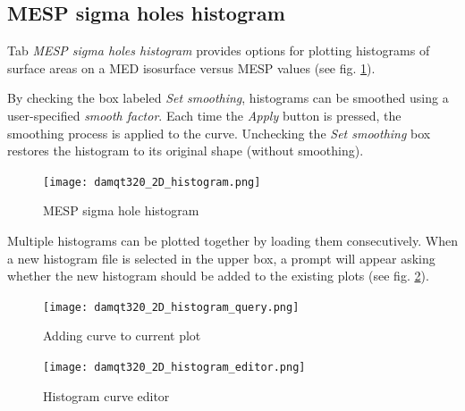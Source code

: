 \documentclass[10pt]{article}
\begin{document}
\subsection{MESP sigma holes histogram \label{sec:3.3}}

Tab {\it MESP sigma holes histogram} provides options  
for plotting histograms of surface areas on a MED isosurface versus MESP values  
(see fig. \ref{fig:3_3_1}).  

By checking the box labeled {\it Set smoothing},  
histograms can be smoothed using a user-specified {\it smooth factor}.  
Each time the {\it Apply} button is pressed, the smoothing process is applied to the curve.  
Unchecking the {\it Set smoothing} box restores the histogram to its original shape (without smoothing).  

\begin{figure}[H]
\begin{center}
\texttt{[image: damqt320\_2D\_histogram.png]}
\end{center}
\caption{{MESP sigma hole histogram}\label{fig:3_3_1}}
\end{figure}

Multiple histograms can be plotted together by loading them consecutively.  
When a new histogram file is selected in the upper box,  
a prompt will appear asking whether the new histogram should be added  
to the existing plots (see fig. \ref{fig:3_3_2}). 

\begin{minipage}{0.5\linewidth}

\begin{figure}[H]
\begin{center}
\texttt{[image: damqt320\_2D\_histogram\_query.png]}
\end{center}
\caption{{Adding curve to current plot}\label{fig:3_3_2}}
\end{figure}

\end{minipage}
\begin{minipage}{0.5\linewidth}

\begin{figure}[H]
\begin{center}
\texttt{[image: damqt320\_2D\_histogram\_editor.png]}
\end{center}
\caption{{Histogram curve editor}\label{fig:3_3_3}}
\end{figure}

\end{minipage}
\end{document}
